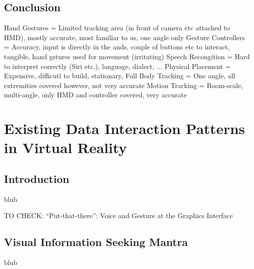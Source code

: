 
\subsection{Conclusion}

Hand Gestures = Limited tracking area (in front of camera etc attached to HMD), mostly accurate, most familiar to us, one angle only
Gesture Controllers = Accuracy, input is directly in the ands, couple of buttons etc to interact, tangible, hand gstures used for movement (irritating)
Speech Recongition = Hard to interpret correctly (Siri etc.), language, dialect, ...
Physical Placement = Expensive, difficutl to build, stationary, 
Full Body Tracking = One angle, all extremities covered however, not very accurate
Motion Tracking = Room-scale, multi-angle, only HMD and controller covered, very accurate



\section{Existing Data Interaction Patterns in Virtual Reality}

\label{SectionLiteratureReviewSRQ2}


\subsection{Introduction}

blub


TO CHECK: “Put-that-there”: Voice and Gesture at the Graphics Interface \citep{Bolt1980}


\subsection{Visual Information Seeking Mantra}

blub


